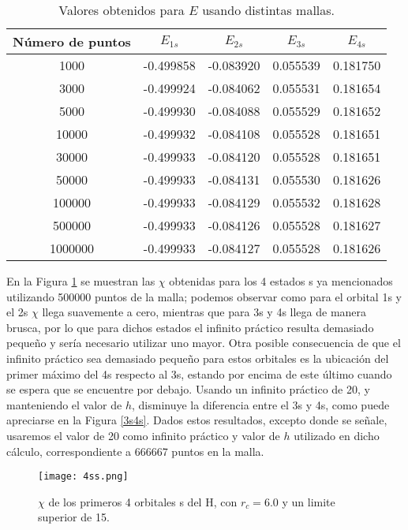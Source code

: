 \documentclass[12pt,a4paper]{report}
\begin{document}
\begin{table}[h]
\centering
\begin{tabular}{|c | c|c|c|c|}
\hline
Número de puntos & $E_{1s}$& $E_{2s}$&$E_{3s}$&$E_{4s}$\\
\hline
1000   & -0.499858& -0.083920 & 0.055539 & 0.181750\\
3000   & -0.499924& -0.084062 & 0.055531 & 0.181654\\
5000   & -0.499930& -0.084088 & 0.055529 & 0.181652\\
10000  & -0.499932& -0.084108 & 0.055528 & 0.181651\\
30000  & -0.499933& -0.084120 & 0.055528 & 0.181651\\
50000  & -0.499933& -0.084131 & 0.055530 & 0.181626\\
100000 & -0.499933& -0.084129 & 0.055532 & 0.181628\\
500000 & -0.499933& -0.084126 & 0.055528 & 0.181627\\
1000000& -0.499933& -0.084127 & 0.055528 & 0.181626\\
\hline
\end{tabular}
\caption{Valores obtenidos para $E$ usando distintas mallas. \label{tab1}}
\end{table}

En la Figura \ref{4ss} se muestran las $\chi$ obtenidas para los 4 estados s ya mencionados utilizando 500000 puntos de la malla; podemos observar como para el orbital 1s y el 2s $\chi$ llega suavemente a cero, mientras que para 3s y 4s llega de manera brusca, por lo que para dichos estados el infinito práctico resulta demasiado pequeño y sería necesario utilizar uno mayor. Otra posible consecuencia de que el infinito práctico sea demasiado pequeño para estos orbitales es la ubicación del primer máximo del 4s respecto al 3s, estando por encima de este último cuando se espera que se encuentre por debajo. Usando un infinito práctico de 20, y manteniendo el valor de $h$, disminuye la diferencia entre el 3s y 4s, como puede apreciarse en la Figura \ref{3s4s}. Dados estos resultados, excepto donde se señale, usaremos el valor de 20 como infinito práctico y valor de $h$ utilizado en dicho cálculo, correspondiente a 666667 puntos en la malla.


\begin{figure}[h]
\centering
\texttt{[image: 4ss.png]}
\caption{$\chi$ de los primeros 4 orbitales s del H, con $r_c=6.0$ y un limite superior de 15.\label{4ss}}
\end{figure}
\end{document}

